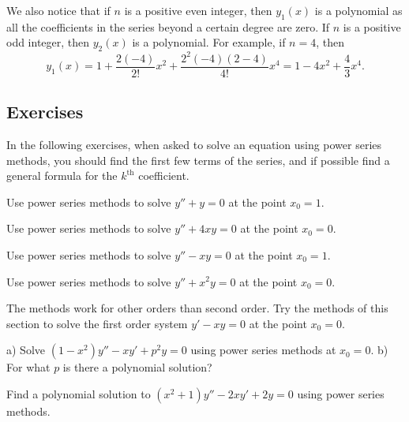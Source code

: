 \documentclass[12pt]{book}
\begin{document}
\begin{example}
We also notice that if $n$ is a positive even integer, then $y_1(x)$ is a
polynomial as all the coefficients in the series beyond a certain
degree are zero.  If $n$ is a positive odd integer, then $y_2(x)$ is
a polynomial.  For example, if $n=4$, then
\begin{equation*}
y_1(x) = 1 + \frac{2(-4)}{2!} x^2 + \frac{2^2(-4)(2-4)}{4!} x^4
= 1 - 4x^2 + \frac{4}{3} x^4 .
\end{equation*}
\end{example}

\subsection{Exercises}

In the following exercises, when asked to solve an equation using power
series methods, you should find the first few terms of the series,
and if possible find a general formula for the $k^{\text{th}}$ coefficient.

\begin{exercise}
Use power series methods to solve $y''+y = 0$ at the point $x_0 = 1$.
\end{exercise}

\begin{exercise}
Use power series methods to solve $y''+4xy = 0$ at the point $x_0 = 0$.
\end{exercise}

\begin{exercise}
Use power series methods to solve $y''-xy = 0$ at the point $x_0 = 1$.
\end{exercise}

\begin{exercise}
Use power series methods to solve $y''+x^2y = 0$ at the point $x_0 = 0$.
\end{exercise}

\begin{exercise}
The methods work for other orders than second order.  Try the methods
of this section to solve the first order system $y'-xy = 0$ at
the point $x_0 = 0$.
\end{exercise}

\begin{exercise}
a) Solve $(1-x^2)y''-xy' + p^2y = 0$ using power series methods at $x_0=0$.
b) For what $p$ is there a polynomial solution?
\end{exercise}

\begin{exercise}
Find a polynomial solution to $(x^2+1) y''-2xy'+2y = 0$ using
power series methods.
\end{exercise}
\end{document}

